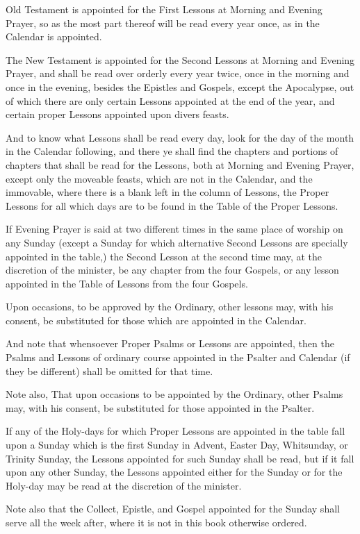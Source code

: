 
 Old Testament is appointed for the First Lessons at Morning and Evening Prayer, so as the most part thereof will be read every year once, as in the Calendar is appointed.

The New Testament is appointed for the Second Lessons at Morning and Evening Prayer, and shall be read over orderly every year twice, once in the morning and once in the evening, besides the Epistles and Gospels, except the Apocalypse, out of which there are only certain Lessons appointed at the end of the year, and certain proper Lessons appointed upon divers feasts.

And to know what Lessons shall be read every day, look for the day of the month in the Calendar following, and there ye shall find the chapters and portions of chapters that shall be read for the Lessons, both at Morning and Evening Prayer, except only the moveable feasts, which are not in the Calendar, and the immovable, where there is a blank left in the column of Lessons, the Proper Lessons for all which days are to be found in the Table of the Proper Lessons.

If Evening Prayer is said at two different times in the same place of worship on any Sunday (except a Sunday for which alternative Second Lessons are specially appointed in the table,) the Second Lesson at the second time may, at the discretion of the minister, be any chapter from the four Gospels, or any lesson appointed in the Table of Lessons from the four Gospels.

Upon occasions, to be approved by the Ordinary, other lessons may, with his consent, be substituted for those which are appointed in the Calendar.

And note that whensoever Proper Psalms or Lessons are appointed, then the Psalms and Lessons of ordinary course appointed in the Psalter and Calendar (if they be different) shall be omitted for that time.

\newpage

Note also, That upon occasions to be appointed by the Ordinary, other Psalms may, with his consent, be substituted for those appointed in the Psalter.

If any of the Holy-days for which Proper Lessons are appointed in the table fall upon a Sunday which is the first Sunday in Advent, Easter Day, Whitsunday, or Trinity Sunday, the Lessons appointed for such Sunday shall be read, but if it fall upon any other Sunday, the Lessons appointed either for the Sunday or for the Holy-day may be read at the discretion of the minister.

Note also that the Collect, Epistle, and Gospel appointed for the Sunday shall serve all the week after, where it is not in this book otherwise ordered.

\clearpage
